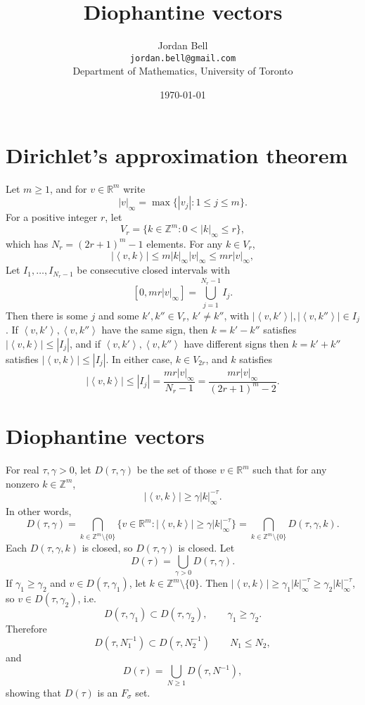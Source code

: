 \documentclass{article}
\newcommand{\inner}[2]{\left\langle #1, #2 \right\rangle}
\theoremstyle{definition}
\begin{document}
\title{Diophantine vectors}
\author{Jordan Bell\\ \texttt{jordan.bell@gmail.com}\\Department of Mathematics, University of Toronto}
\date{\today}

\maketitle


\section{Dirichlet's approximation theorem}
Let $m \geq 1$, and
for $v \in \mathbb{R}^m$ write
\[
|v|_\infty = \max \{|v_j|:1 \leq j \leq m\}.
\]
For a positive integer $r$, let
\[
V_r = \{k \in \mathbb{Z}^m: 0 < |k|_\infty \leq r\},
\] 
which has $N_r=(2r+1)^m-1$ elements. 
For any $k \in V_r$,
\[
|\inner{v}{k}| \leq m |k|_\infty |v|_\infty \leq m r |v|_\infty,
\]
Let $I_1,\ldots,I_{N_r-1}$ be consecutive closed intervals with
\[
[0,mr|v|_\infty] = \bigcup_{j=1}^{N_r-1} I_j.
\]
Then there is some $j$ and some $k',k'' \in V_r$, $k' \neq k''$, with $|\inner{v}{k'}|,|\inner{v}{k''}| \in I_j$.
If $\inner{v}{k'}, \inner{v}{k''}$ have the same sign, then $k=k'-k''$ satisfies
$|\inner{v}{k}| \leq |I_j|$, and if
$\inner{v}{k'},\inner{v}{k''}$ have different signs then
$k=k'+k''$ satisfies $|\inner{v}{k}| \leq |I_j|$.
In either case, $k \in V_{2r}$, and $k$ satisfies
\[
|\inner{v}{k}| \leq |I_j| =  \frac{mr|v|_\infty}{N_r-1} = \frac{mr|v|_\infty}{(2r+1)^m-2}.
\]




\section{Diophantine vectors}
For real $\tau,\gamma>0$,
let
$D(\tau,\gamma)$ be the set of those $v \in \mathbb{R}^m$ such that for any nonzero $k \in \mathbb{Z}^m$,
\[
|\inner{v}{k}| \geq \gamma |k|_\infty^{-\tau}.
\]
In other words, 
\[
D(\tau,\gamma) =  \bigcap_{k \in \mathbb{Z}^m \setminus \{0\}} \{v \in \mathbb{R}^m: |\inner{v}{k}| \geq \gamma |k|_\infty^{-\tau}\}
= \bigcap_{k \in \mathbb{Z}^m \setminus \{0\}} D(\tau,\gamma,k).
\]
Each $D(\tau,\gamma,k)$ is closed, so $D(\tau,\gamma)$ is closed. 
Let 
\[
D(\tau) = \bigcup_{\gamma>0} D(\tau,\gamma).
\]
If $\gamma_1 \geq \gamma_2$ and $v \in D(\tau,\gamma_1)$, let $k \in \mathbb{Z}^m \setminus \{0\}$. Then
$|\inner{v}{k}| \geq \gamma_1 |k|_\infty^{-\tau} \geq \gamma_2 |k|_\infty^{-\tau}$, so
$v \in D(\tau,\gamma_2)$, i.e. 
\[
D(\tau,\gamma_1) \subset D(\tau,\gamma_2),\qquad \gamma_1 \geq \gamma_2.
\] 
Therefore
\[
D(\tau,N_1^{-1}) \subset D(\tau,N_2^{-1})\qquad N_1 \leq N_2,
\]
and
\[
D(\tau) = \bigcup_{N \geq 1} D(\tau,N^{-1}),
\]
showing that $D(\tau)$ is an $F_\sigma$ set.
\end{document}
